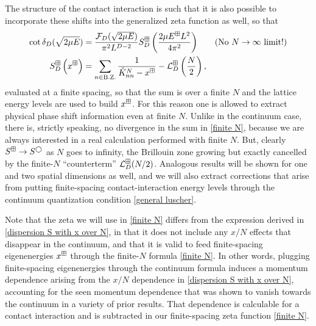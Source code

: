 The structure of the contact interaction is such that it is also possible to incorporate these shifts into the generalized zeta function as well, so that
\begin{align}
    \cot \delta_D(\sqrt{2\mu E})
    &=
    \frac{\mathcal{F}_D(\sqrt{2\mu E})}{\pi^2 L^{D-2}} S^{\boxplus }_D\left(\frac{2\mu E^{\boxplus} L^2}{4\pi^2}\right)
    && \text{(No $N\rightarrow\infty$ limit!)}
    \\
    \label{eq:finite N}
    S^{\boxplus}_D\left(x^\boxplus\right)
    &=
		\sum_{n\in\text{B.Z.}}\frac{1}{ \tilde K_{nn}^{N} - x^\boxplus} - \mathcal{L}_D^{\boxplus}\left(\frac{N}{2}\right),
\end{align}
evaluated at a finite spacing, so that the sum is over a finite $N$ and the lattice energy levels are used to build $x^\boxplus$.
For this reason one is allowed to extract physical phase shift information even at finite $N$.
Unlike in the continuum case, there is, strictly speaking, no divergence in the sum in \eqref{finite N}, because we are always interested in a real calculation performed with finite $N$.
But, clearly $S^{\boxplus}\rightarrow S^\bigcirc$ as $N$ goes to infinity, the Brillouin zone growing but exactly cancelled by the finite-$N$ ``counterterm'' $\mathcal{L}_D^\boxplus (N/2)$.
Analogous results will be shown for one and two spatial dimensions as well, and we will also extract corrections that arise from putting finite-spacing contact-interaction energy levels through the continuum quantization condition \eqref{general luscher}.

Note that the zeta we will use in \eqref{finite N} differs from the expression derived in \eqref{dispersion S with x over N}, in that it does not include any $x/N$ effects that disappear in the continuum, and that it is valid to feed finite-spacing eigenenergies $x^\boxplus$ through the finite-$N$ formula \eqref{finite N}.  In other words, plugging finite-spacing eigenenergies through the continuum formula induces a momentum dependence arising from the $x/N$ dependence in \eqref{dispersion S with x over N}, accounting for the seen momentum dependence that was shown to vanish towards the continuum in a variety of prior results.  That dependence is calculable for a contact interaction and is subtracted in our finite-spacing zeta function \eqref{finite N}.
